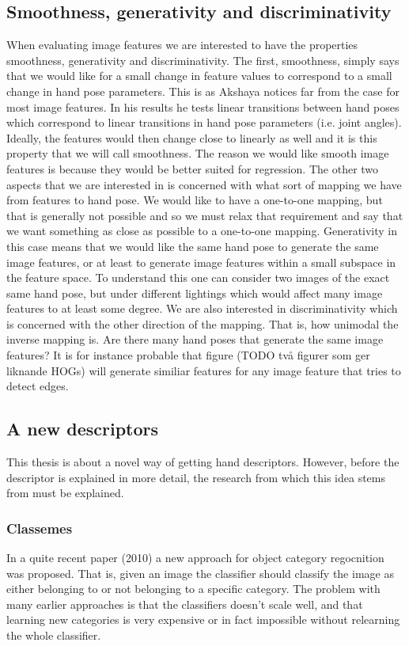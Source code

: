 \documentclass[a4paper,11pt]{kth-mag}
\begin{document}
\subsection{Smoothness, generativity and discriminativity}
\label{sec:featureproperties}
When evaluating image features we are interested to have the properties smoothness, generativity and discriminativity.
The first, smoothness, simply says that we would like for a small change in feature values to correspond to a small change in hand pose parameters.
This is as Akshaya notices far from the case for most image features.
In his results he tests linear transitions between hand poses which correspond to linear transitions in hand pose parameters (i.e. joint angles).
Ideally, the features would then change close to linearly as well and it is this property that we will call smoothness.
The reason we would like smooth image features is because they would be better suited for regression.
The other two aspects that we are interested in is concerned with what sort of mapping we have from features to hand pose.
We would like to have a one-to-one mapping, but that is generally not possible and so we must relax that requirement and say that we want something as close as possible to a one-to-one mapping.
Generativity in this case means that we would like the same hand pose to generate the same image features, or at least to generate image features within a small subspace in the feature space.
To understand this one can consider two images of the exact same hand pose, but under different lightings which would affect many image features to at least some degree.
We are also interested in discriminativity which is concerned with the other direction of the mapping.
That is, how unimodal the inverse mapping is.
Are there many hand poses that generate the same image features? It is for instance probable that figure (TODO två figurer som ger liknande HOGs)
will generate similiar features for any image feature that tries to detect edges.


\subsection{A new descriptors}
This thesis is about a novel way of getting hand descriptors.
However, before the descriptor is explained in more detail, the research from which this idea stems from must be explained.

\subsubsection{Classemes}
In a quite recent paper (2010) a new approach for object category regocnition was proposed\cite{classeme1}.
That is, given an image the classifier should classify the image as either belonging to or not belonging to a specific category.
The problem with many earlier approaches is that the classifiers doesn't scale well, and that learning new categories is very expensive or in fact impossible without relearning the whole classifier\cite{classeme1}.
\end{document}

